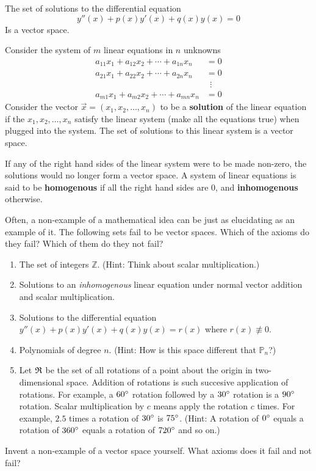 \begin{example}
	The set of solutions to the differential equation
	$$
	y''(x) + p(x)y'(x) + q(x)y(x) = 0
	$$
	Is a vector space.
\end{example}

\begin{example}
	Consider the system of $m$ linear equations in $n$ unknowns
	\begin{align*}
		a_{11} x_1 + a_{12} x_2 + \cdots + a_{1n}x_n &= 0 \\
		a_{21} x_1 + a_{22} x_2 + \cdots + a_{2n}x_n &= 0\\
		&\:\:\vdots \\
		a_{m1} x_1 + a_{m2} x_2 + \cdots + a_{mn}x_n &= 0
	\end{align*}
	Consider the vector $\vec{x} = (x_1, x_2, \ldots, x_n)$ to be a \textbf{solution} of the linear equation if the $x_1, x_2, \ldots, x_n$ satisfy the linear system (make all the equations true) when plugged into the system. The set of solutions to this linear system is a vector space.
\end{example}

\begin{remark}
	If any of the right hand sides of the linear system were to be made non-zero, the solutions would no longer form a vector space. A system of linear equations is said to be \textbf{homogenous} if all the right hand sides are 0, and \textbf{inhomogenous} otherwise.
\end{remark}

\begin{problem}
	Often, a non-example of a mathematical idea can be just as elucidating as an example of it. The following sets fail to be vector spaces. Which of the axioms do they fail? Which of them do they not fail?
	\begin{enumerate}
		\item The set of integers $\mathbb{Z}$. (Hint: Think about scalar multiplication.)
		\item Solutions to an \textit{inhomogenous} linear equation under normal vector addition and scalar multiplication.
		\item Solutions to the differential equation $y''(x) + p(x)y'(x) + q(x)y(x) = r(x)$ where $r(x) \not\equiv 0$.
		\item Polynomials of degree $n$. (Hint: How is this space different that $\mathbb{P}_n$?)
		\item Let $\frak{R}$ be the set of all rotations of a point about the origin in two-dimensional space. Addition of rotations is such succesive application of rotations. For example, a $60\degree$ rotation followed by a $30\degree$ rotation is a $90\degree$ rotation. Scalar multiplication by $c$ means apply the rotation $c$ times. For example, $2.5$ times a rotation of $30\degree$ is $75\degree$. (Hint: A rotation of $0\degree$ equals a rotation of $360\degree$ equals a rotation of $720\degree$ and so on.)
	\end{enumerate}
	Invent a non-example of a vector space yourself. What axioms does it fail and not fail?
\end{problem}

